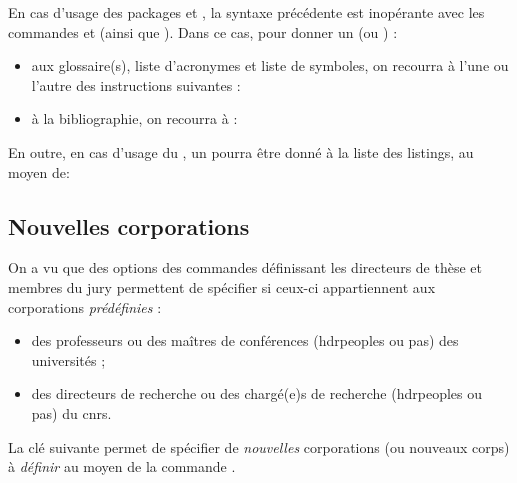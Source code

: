 En cas d'usage des packages  et , la
syntaxe précédente est inopérante avec les commandes
 et  (ainsi que
). Dans ce cas, pour donner un  (ou
)  :
\begin{itemize}
\item%
  aux glossaire(s), liste d'acronymes et liste de symboles, on recourra
  à l'une ou l'autre des instructions suivantes :
\begin{bodycode}[listing options={morekeywords={[2]title}}]
\printglossary[title="\meta{titre alternatif}"]
\printglossaries[title="\meta{titre alternatif}"]
\printabbreviations[title="\meta{titre alternatif}"]
\printsymbols[title="\meta{titre alternatif}"]
\end{bodycode}
\item%
  à la bibliographie, on recourra à :
\begin{bodycode}[listing options={morekeywords={[2]title}}]
\printbibliography[title="\meta{titre alternatif}"]
\end{bodycode}
\end{itemize}

En outre, en cas d'usage du , un 
pourra être donné à la liste des listings, au moyen de:
\begin{preamblecode}[title=Par exemple dans le \File{\configurationfile}]
\renewcommand\lstlistingname{"\meta{titre alternatif}"}
\end{preamblecode}

\subsection{Nouvelles corporations}\label{sec-nouveaux-corps}
%
%

On a vu  que des options des commandes définissant les
directeurs de thèse et membres du jury permettent de spécifier si ceux-ci
appartiennent aux corporations \emph{prédéfinies} :
\begin{itemize}
\item des professeurs ou des maîtres de conférences (\glspl{hdrpeople} ou pas) des
  universités ;
\item des directeurs de recherche ou des chargé(e)s de recherche (\glspl{hdrpeople} ou
  pas) du \gls{cnrs}.
\end{itemize}
La clé  suivante permet de spécifier de \emph{nouvelles}
corporations (ou nouveaux corps) à \emph{définir} au moyen de la commande
.


